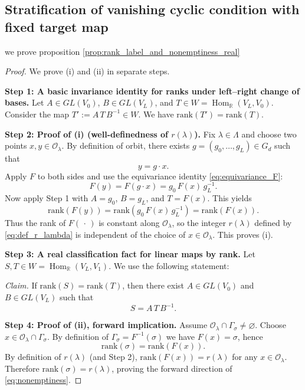 \documentclass{article}
\newcommand{\Hom}{\operatorname{Hom}}
\theoremstyle{definition}
\begin{document}
\subsection*{Stratification of vanishing cyclic condition with fixed target map}
we prove proposition \ref{prop:rank_label_and_nonemptiness_real}
\begin{proof}\label{proof:rank_label_and_nonemptiness_real}
We prove (i) and (ii) in separate steps.

\medskip\noindent
\textbf{Step 1: A basic invariance identity for ranks under left--right change of bases.}
Let $A\in GL(V_0)$, $B\in GL(V_L)$, and $T\in W=\Hom_{\mathbb{R}}(V_L,V_0)$.
Consider the map $T':=A\,T\,B^{-1}\in W$.
We have $\mathrm{rank}(T')=\mathrm{rank}(T)$.

\medskip\noindent
\textbf{Step 2: Proof of (i) (well-definedness of $r(\lambda)$).}
Fix $\lambda\in\Lambda$ and choose two points $x,y\in \mathcal O_\lambda$.
By definition of orbit, there exists $g=(g_0,\dots,g_L)\in G_d$ such that
\[
y=g\cdot x.
\]
Apply $F$ to both sides and use the equivariance identity \eqref{eq:equivariance_F}:
\[
F(y)=F(g\cdot x)=g_0\,F(x)\,g_L^{-1}.
\]
Now apply Step 1 with $A=g_0$, $B=g_L$, and $T=F(x)$. This yields
\[
\mathrm{rank}(F(y))=\mathrm{rank}(g_0\,F(x)\,g_L^{-1})=\mathrm{rank}(F(x)).
\]
Thus the rank of $F(\,\cdot\,)$ is constant along $\mathcal O_\lambda$, so the integer $r(\lambda)$
defined by \eqref{eq:def_r_lambda} is independent of the choice of $x\in\mathcal O_\lambda$.
This proves (i).

\medskip\noindent
\textbf{Step 3: A real classification fact for linear maps by rank.}
Let $S,T\in W=\Hom_{\mathbb{R}}(V_L,V_1)$. We use the following statement:

\smallskip\noindent
\emph{Claim.} If $\mathrm{rank}(S)=\mathrm{rank}(T)$, then there exist $A\in GL(V_0)$ and $B\in GL(V_L)$ such that
\begin{equation}
\label{eq:rank_equivalence}
S=A\,T\,B^{-1}.
\end{equation}

\medskip\noindent
\textbf{Step 4: Proof of (ii), forward implication.}
Assume $\mathcal O_\lambda\cap \Gamma_\sigma\neq \varnothing$.
Choose $x\in \mathcal O_\lambda\cap \Gamma_\sigma$.
By definition of $\Gamma_\sigma=F^{-1}(\sigma)$ we have $F(x)=\sigma$, hence
\[
\mathrm{rank}(\sigma)=\mathrm{rank}(F(x)).
\]
By definition of $r(\lambda)$ (and Step 2), $\mathrm{rank}(F(x))=r(\lambda)$ for any $x\in\mathcal O_\lambda$.
Therefore $\mathrm{rank}(\sigma)=r(\lambda)$, proving the forward direction of \eqref{eq:nonemptiness}.


\end{proof}
\end{document}
